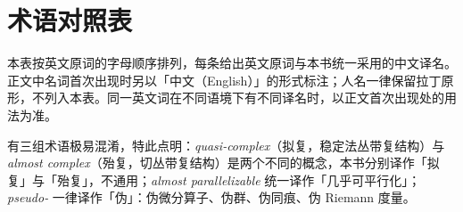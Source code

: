 
\chapter{术语对照表}

\noindent 本表按英文原词的字母顺序排列，每条给出英文原词与本书统一采用的中文译名。正文中名词首次出现时另以「中文（English）」的形式标注；人名一律保留拉丁原形，不列入本表。同一英文词在不同语境下有不同译名时，以正文首次出现处的用法为准。

\noindent 有三组术语极易混淆，特此点明：\emph{quasi-complex}（拟复，稳定法丛带复结构）与 \emph{almost complex}（殆复，切丛带复结构）是两个不同的概念，本书分别译作「拟复」与「殆复」，不通用；\emph{almost parallelizable} 统一译作「几乎可平行化」；\emph{pseudo-} 一律译作「伪」：伪微分算子、伪群、伪同痕、伪 Riemann 度量。

\small
